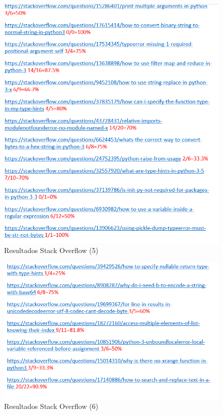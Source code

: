 \documentclass[a4paper, 12pt]{book}
\begin{document}
\begin{figure}
	\centering
    \includegraphics[width=1\textwidth]{img/stack9}
    \caption{Resultados Stack Overflow (5)}
    \label{figura:stack9}
 \end{figure}
 
\begin{figure}
	\centering
    \includegraphics[width=1\textwidth]{img/stack10}
    \caption{Resultados Stack Overflow (6)}
    \label{figura:stack10}
 \end{figure}
 
\end{document}
